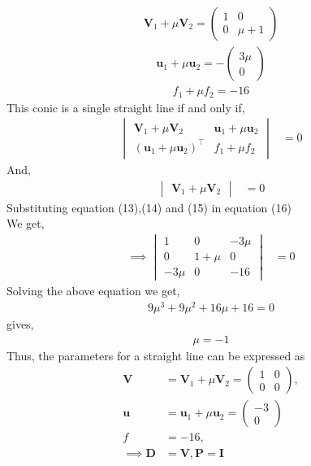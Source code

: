 \documentclass[10pt,a4paper]{report}
\newcommand{\myvec}[1]{\ensuremath{\begin{pmatrix}#1\end{pmatrix}}}
\let\vec\mathbf
\let\vec\mathbf
\newcommand{\mydet}[1]{\ensuremath{\begin{vmatrix}#1\end{vmatrix}}}
\providecommand{\brak}[1]{\ensuremath{\left(#1\right)}}
\begin{document}
\begin{multicols}{2}
\begin{align}
\vec{V}_1+\mu\vec{V}_2= \myvec{
1 & 0\\
0 & \mu+1
}
\end{align}
\begin{align}
\vec{u}_1+\mu\vec{u}_2= -\myvec{
3\mu\\
0
}
\end{align}
\begin{align}
f_1+\mu f_2= -16
\end{align}
This conic is a single straight line if and only if, \\ \vspace{1mm}
\begin{align}
\mydet{\vec{V}_1 + \mu\vec{V}_2 & \vec{u}_1+\mu \vec{u}_2\\ \brak{\vec{u}_1+\mu \vec{u}_2}^{\top} & f_1 + \mu f_2} &= 0
\end{align}
And,\\
\begin{align}
\mydet{\vec{V}_1 + \mu\vec{V}_2} &= 0
\end{align}
Substituting equation (13),(14) and (15) in equation (16)\\ \vspace{1mm}
We get,\\ \vspace{1mm}
\begin{align}
\implies \mydet{1& 0 & -3\mu\\ 
0 & 1+\mu & 0 \\
-3\mu & 0 & -16
} &= 0
\end{align}
Solving the above equation we get,\\ \vspace{1mm}
\begin{align}
9\mu^3 + 9\mu^2 + 16\mu + 16=0
\end{align}
gives,\\ \vspace{1mm}
\begin{align}
    \mu = -1
\end{align}
 Thus, the parameters for a straight line can be expressed as\\ \vspace{1mm}
 \begin{align}
	\vec{V} &= 
\vec{V}_1 + \mu\vec{V}_2
=\myvec{ 1 & 0 \\ 0 & 0},
\\
	\vec{u} &=
\vec{u}_1+\mu \vec{u}_2
	= \myvec{
-3\\
0
    }
\\
	f&=-16,
	\\
	\implies \vec{D} &= \vec{V}, \vec{P} = \vec{I}
    \end{align}
 


\end{multicols}
\end{document}
